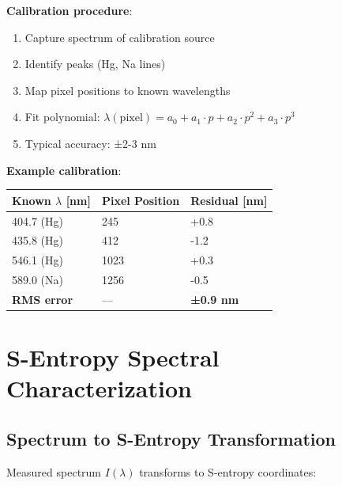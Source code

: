 \documentclass[12pt,a4paper]{article}
\begin{document}
\textbf{Calibration procedure}:
\begin{enumerate}
\item Capture spectrum of calibration source
\item Identify peaks (Hg, Na lines)
\item Map pixel positions to known wavelengths
\item Fit polynomial: $\lambda(\text{pixel}) = a_0 + a_1 \cdot p + a_2 \cdot p^2 + a_3 \cdot p^3$
\item Typical accuracy: ±2-3 nm
\end{enumerate}

\textbf{Example calibration}:
\begin{center}
\begin{tabular}{|l|l|l|}
\hline
\textbf{Known $\lambda$ [nm]} & \textbf{Pixel Position} & \textbf{Residual [nm]} \\
\hline
404.7 (Hg) & 245 & +0.8 \\
435.8 (Hg) & 412 & -1.2 \\
546.1 (Hg) & 1023 & +0.3 \\
589.0 (Na) & 1256 & -0.5 \\
\hline
\textbf{RMS error} & — & \textbf{±0.9 nm} \\
\hline
\end{tabular}
\end{center}

\section{S-Entropy Spectral Characterization}

\subsection{Spectrum to S-Entropy Transformation}

Measured spectrum $I(\lambda)$ transforms to S-entropy coordinates:
\end{document}

